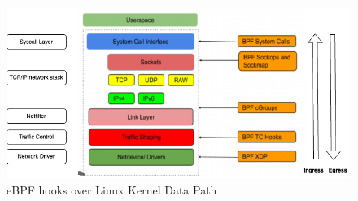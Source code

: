 \documentclass [11pt, proquest] {uwthesis}[2020/02/24]
\begin{document}
\begin{figure}
\includegraphics[width=1.0\textwidth]{images/kernel_datapath.png}
\caption{eBPF hooks over Linux Kernel Data Path}
\label{sec:ebpf-hooks-kernel-network-datapath}
\end{figure}
\end{document}
